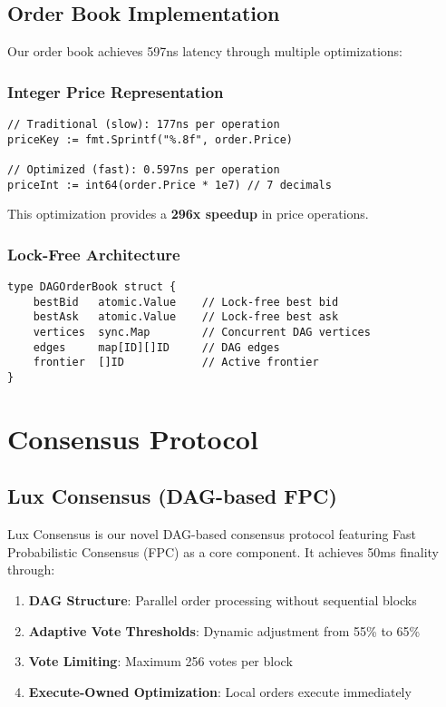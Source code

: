 \documentclass[11pt,a4paper]{article}
\begin{document}
\subsection{Order Book Implementation}

Our order book achieves 597ns latency through multiple optimizations:

\subsubsection{Integer Price Representation}
\begin{lstlisting}
// Traditional (slow): 177ns per operation
priceKey := fmt.Sprintf("%.8f", order.Price)

// Optimized (fast): 0.597ns per operation  
priceInt := int64(order.Price * 1e7) // 7 decimals
\end{lstlisting}

This optimization provides a \textbf{296x speedup} in price operations.

\subsubsection{Lock-Free Architecture}
\begin{lstlisting}
type DAGOrderBook struct {
    bestBid   atomic.Value    // Lock-free best bid
    bestAsk   atomic.Value    // Lock-free best ask
    vertices  sync.Map        // Concurrent DAG vertices
    edges     map[ID][]ID     // DAG edges
    frontier  []ID            // Active frontier
}
\end{lstlisting}

\section{Consensus Protocol}

\subsection{Lux Consensus (DAG-based FPC)}

Lux Consensus is our novel DAG-based consensus protocol featuring Fast Probabilistic Consensus (FPC) as a core component. It achieves 50ms finality through:

\begin{enumerate}
    \item \textbf{DAG Structure}: Parallel order processing without sequential blocks
    \item \textbf{Adaptive Vote Thresholds}: Dynamic adjustment from 55\% to 65\%
    \item \textbf{Vote Limiting}: Maximum 256 votes per block
    \item \textbf{Execute-Owned Optimization}: Local orders execute immediately
\end{enumerate}
\end{document}
